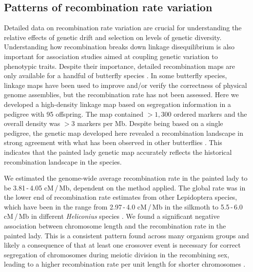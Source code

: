 \documentclass[twocolumn]{bmcart}%
\begin{document}
\subsection*{Patterns of recombination rate variation}

Detailed data on recombination rate variation are crucial for understanding the relative effects of genetic drift and selection on levels of genetic diversity. Understanding how recombination breaks down linkage disequilibrium is also important for association studies aimed at coupling genetic variation to phenotypic traits. Despite their importance, detailed recombination maps are only available for a handful of butterfly species \citep{beldadeGeneBasedLinkageMap2009, celorio-manceraChromosomeLevelAssembly2021, daveyNoEvidenceMaintenance2017, rosserComplexBasisHybrid2022, smolanderImprovedChromosomelevelGenome2022, tunstromComplexInterplayBalancing2021}. In some butterfly species, linkage maps have been used to improve and/or verify the correctness of physical genome assemblies, but the recombination rate has not been assessed. Here we developed a high-density linkage map based on segregation information in a pedigree with 95 offspring. The map contained $> 1,300$ ordered markers and the overall density was $> 3$ markers per Mb. Despite being based on a single pedigree, the genetic map developed here revealed a recombination landscape in strong agreement with what has been observed in other butterflies \citep{daveyNoEvidenceMaintenance2017, martinRecombinationRateVariation2019}. This indicates that the painted lady genetic map accurately reflects the historical recombination landscape in the species. 

We estimated the genome-wide average recombination rate in the painted lady to be 3.81\,-\,4.05 cM\,/\,Mb, dependent on the method applied. The global rate was in the lower end of recombination rate estimates from other Lepidoptera species, which have been in the range from 2.97\,-\,4.0 cM\,/\,Mb in the silkmoth \citep{yamamotoBACbasedIntegratedLinkage2008, yasukochiDenseGeneticMap1998} to 5.5\,-\,6.0 cM\,/\,Mb in different \textit{Heliconius} species \citep{jigginsGeneticLinkageMap2005, toblerFirstgenerationLinkageMap2005}. We found a significant negative association between chromosome length and the recombination rate in the painted lady. This is a consistent pattern found across many organism groups and likely a consequence of that at least one crossover event is necessary for correct segregation of chromosomes during meiotic division in the recombining sex, leading to a higher recombination rate per unit length for shorter chromosomes \citep{haenelMetaanalysisChromosomescaleCrossover2018, kawakamiWholegenomePatternsLinkage2017, martinRecombinationRateVariation2019}. 
\end{document}
